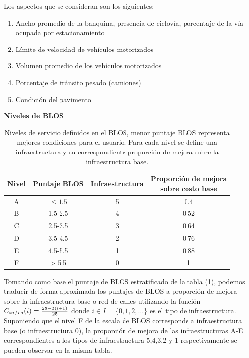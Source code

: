 \documentclass{article}
\begin{document}
  Los aspectos que se consideran son los siguientes:

  \begin{enumerate}
    \item{Ancho promedio de la banquina, presencia de ciclovía, porcentaje de la vía ocupada por estacionamiento}
    \item{Límite de velocidad de vehículos motorizados}
    \item{Volumen promedio de los vehículos motorizados}
    \item{Porcentaje de tránsito pesado (camiones)}
    \item{Condición del pavimento}
  \end{enumerate}

  \begin{table}[h!]
    \centering
    \caption*{{\bf Niveles de BLOS}}
    \begin{tabular}{cccc}
      \toprule
        Nivel & Puntaje BLOS & Infraestructura & \shortstack{Proporción de mejora \\ sobre costo base} \\
      \midrule
        A     & $\leq 1.5$   & 5              & 0.4   \\
        B     & 1.5-2.5      & 4              & 0.52  \\
        C     & 2.5-3.5      & 3              & 0.64  \\
        D     & 3.5-4.5      & 2              & 0.76  \\
        E     & 4.5-5.5      & 1              & 0.88  \\
        F     & > 5.5        & 0              & 1     \\
      \bottomrule
    \end{tabular}
    \caption{Niveles de servicio definidos en el BLOS, menor puntaje BLOS representa mejores condiciones para el usuario. Para cada nivel se define una infraestructura y su correspondiente proporción de mejora sobre la infraestructura base.}\label{table:blosscores}
  \end{table}

  Tomando como base el puntaje de BLOS estratificado de la tabla (\ref{table:blosscores}), podemos traducir de forma aproximada los puntajes de BLOS a proporción de mejora sobre la infraestructura base o red de calles utilizando la función $C_{infra}(i) = {28 - 3 (i + 1) \over 25}$ donde $i \in I = \{0,1,2,\ldots\}$ es el tipo de infraestructura. Suponiendo que el nivel F de la escala de BLOS corresponde a infraestructura base (o infraestructura 0), la proporción de mejora de las infraestructuras A-E correspondientes a los tipos de infraestructura 5,4,3,2 y 1 respectivamente se pueden observar en la misma tabla.
\end{document}

